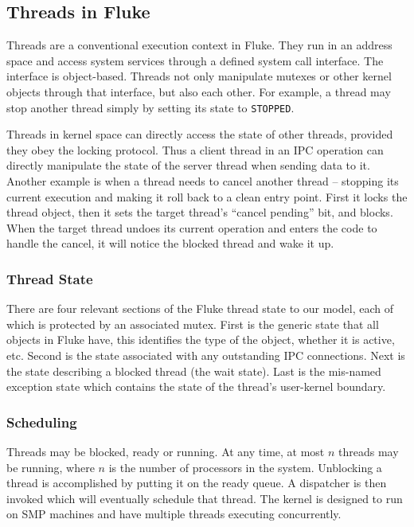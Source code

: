 %
%
%

\subsection{Threads in Fluke}

Threads are a conventional execution context in Fluke.
They run in an address space and access system services through
a defined system call interface.  The interface is object-based.
Threads not only manipulate mutexes or other kernel objects
through that interface, but also each other. For example, a thread
may stop another thread simply by setting its state to {\tt STOPPED}.


Threads in kernel space can directly access the state of other threads, 
provided they obey the locking protocol.  
Thus a client thread in an IPC operation
can directly manipulate the state of the server thread when sending
data to it.  Another example is when a thread needs to cancel another
thread -- stopping its current execution and making it roll back to a
clean entry point.  First it locks the thread object, then it sets the
target thread's ``cancel pending'' bit, and blocks.  When the target
thread undoes its current operation and enters the code to handle the
cancel, it will notice the blocked thread and wake it up.

\subsubsection{Thread State}
There are four relevant sections of the Fluke thread state to our
model, each of which is protected by an associated mutex.  First 
is the generic state that all objects in Fluke have, this identifies
the type of the object, whether it is active, etc.  Second is
the state associated with any outstanding IPC connections.  Next
is the state describing a blocked thread (the wait state).  Last
is the mis-named exception state which contains the state of the
thread's user-kernel boundary. 


\subsubsection{Scheduling}
Threads may be blocked, ready or running. At any time, at most
$n$ threads may be running, where $n$ is the number of processors
in the system. Unblocking a thread is accomplished by putting it
on the ready queue. A dispatcher is then invoked which will
eventually schedule that thread.  The kernel is designed to
run on SMP machines and have multiple threads executing
concurrently.

